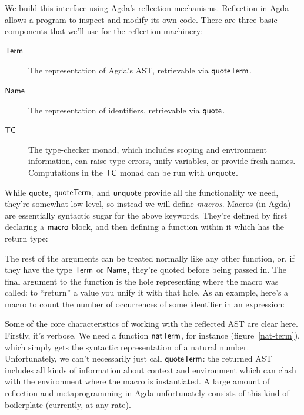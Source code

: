 \documentclass[draft, twocolumn]{article}
\theoremstyle{definition}
\theoremstyle{definition}
\begin{document}
We build this interface using Agda's reflection
mechanisms\cite{van_der_walt_reflection_2012}. Reflection in Agda allows a
program to inspect and modify its own code. There are three basic components
that we'll use for the reflection machinery:
\begin{description}
  \item[\(\AgdaDatatype{Term}\)] The representation of Agda's AST, retrievable
    via \(\AgdaKeyword{quoteTerm}\).
  \item[\(\AgdaDatatype{Name}\)] The representation of identifiers, retrievable
    via \(\AgdaKeyword{quote}\).
  \item[\(\AgdaDatatype{TC}\)] The type-checker monad, which includes scoping
    and environment information, can raise type errors, unify variables, or
    provide fresh names. Computations in the \(\AgdaDatatype{TC}\) monad can be
    run with \(\AgdaKeyword{unquote}\).
\end{description}

While \(\AgdaKeyword{quote}\), \(\AgdaKeyword{quoteTerm}\), and
\(\AgdaKeyword{unquote}\) provide all the functionality we need, they're
somewhat low-level, so instead we will define \emph{macros}. Macros (in Agda)
are essentially syntactic sugar for the above keywords. They're defined by first
declaring a \(\AgdaKeyword{macro}\) block, and then defining a function within
it which has the return type:

The rest of the arguments can be treated normally like any other function, or,
if they have the type \(\AgdaDatatype{Term}\) or \(\AgdaDatatype{Name}\),
they're quoted before being passed in. The final argument to the function is the
hole representing where the macro was called: to ``return'' a value you unify
it with that hole. As an example, here's a macro to count the number of
occurrences of some identifier in an expression:

Some of the core characteristics of working with the reflected AST are clear
here. Firstly, it's verbose. We need a function \(\AgdaFunction{natTerm}\), for
instance (figure~\ref{nat-term}), which simply gets the syntactic representation
of a natural number. Unfortunately, we can't necessarily just call
\(\AgdaKeyword{quoteTerm}\): the returned AST includes all kinds of information
about context and environment which can clash with the environment where the
macro is instantiated. A large amount of reflection and metaprogramming in Agda
unfortunately consists of this kind of boilerplate (currently, at any rate).
\end{document}

